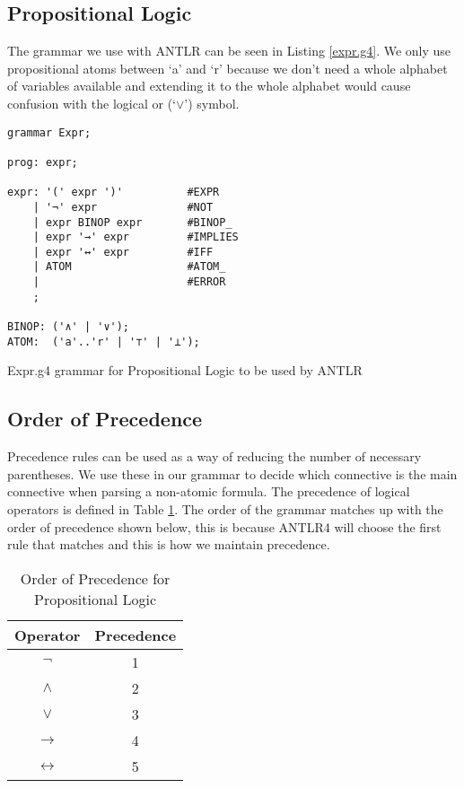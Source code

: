 \documentclass{report}
\begin{document}
\subsection{Propositional Logic}

The grammar we use with ANTLR can be seen in Listing \ref{expr.g4}. We only use propositional atoms between `a' and `r' because we don't need a whole alphabet of variables available and extending it to the whole alphabet would cause confusion with the logical or (`$\lor$') symbol. 

\begin{listing}[ht]
\begin{verbatim}
grammar Expr;	

prog: expr;

expr: '(' expr ')'          #EXPR
    | '¬' expr              #NOT
    | expr BINOP expr       #BINOP_
    | expr '→' expr         #IMPLIES
    | expr '↔' expr         #IFF
    | ATOM                  #ATOM_
    |                       #ERROR
    ;

BINOP: ('∧' | '∨');
ATOM:  ('a'..'r' | '⊤' | '⊥');

\end{verbatim}
\caption{Expr.g4 grammar for Propositional Logic to be used by ANTLR}
\label{expr.g4}
\end{listing}

\subsection{Order of Precedence}

Precedence rules can be used as a way of reducing the number of necessary parentheses. We use these in our grammar to decide which connective is the main connective when parsing a non-atomic formula. The precedence of logical operators is defined in Table \ref{orderofprecendence}. The order of the grammar matches up with the order of precedence shown below, this is because ANTLR4 will choose the first rule that matches and this is how we maintain precedence.

\begin{table}[h]
\begin{center}
\begin{tabular}{|| c | c ||}
    \hline
    Operator & Precedence \\ \hline 
    $\lnot$  & 1 \\
    $\land$  & 2 \\
    $\lor$   & 3 \\
    $\to$    & 4 \\
    $\leftrightarrow$ & 5 \\ \hline
\end{tabular}
\caption{Order of Precedence for Propositional Logic}
\label{orderofprecendence}
\end{center}
\end{table}
\end{document}
